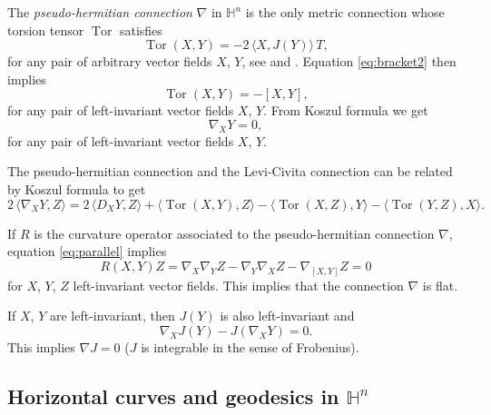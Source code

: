 \documentclass[10pt]{amsart}
\theoremstyle{definition}
\theoremstyle{remark}
\numberwithin{equation}{section}
\begin{document}
The \emph{pseudo-hermitian connection} $\nabla$ in ${{\mathbb{H}}}^n$ is the only metric connection whose torsion tensor $\operatorname{Tor}$ satisfies 
\begin{equation}
\label{eq:torsion}
\operatorname{Tor}(X,Y)=-2\,{\langle{X,J(Y)}\rangle}\,T,
\end{equation}
for any pair of arbitrary vector fields $X$, $Y$, see \cite{MR1000553} and \cite{MR1267892}. Equation \eqref{eq:bracket2} then implies
\[
\operatorname{Tor}(X,Y)=-[X,Y],
\]
for any pair of left-invariant vector fields $X$, $Y$. From Koszul formula we get
\begin{equation}
\label{eq:parallel}
\nabla_X Y=0,
\end{equation}
for any pair of left-invariant vector fields $X$, $Y$.

The pseudo-hermitian connection and the Levi-Civita connection can be related by Koszul formula to get
\[
2\,{\langle{\nabla_{X}Y,Z}\rangle}=2\,{\langle{D_{X}Y,Z}\rangle}+{\langle{\operatorname{Tor}(X,Y),Z}\rangle}
-{\langle{\operatorname{Tor}(X,Z),Y}\rangle}-{\langle{\operatorname{Tor}(Y,Z),X}\rangle}.
\]

If $R$ is the curvature operator associated to the pseudo-hermitian connection $\nabla$, equation \eqref{eq:parallel} implies
\begin{equation}
R(X,Y)Z=\nabla_X\nabla_YZ-\nabla_Y\nabla_XZ-\nabla_{[X,Y]}Z=0
\end{equation}
for $X$, $Y$, $Z$ left-invariant vector fields. This implies that the connection $\nabla$ is flat.

If $X$, $Y$ are left-invariant, then $J(Y)$ is also left-invariant and
\[
\nabla_X J(Y)-J(\nabla_XY)=0.
\]
This implies $\nabla J=0$ ($J$ is integrable in the sense of Frobenius).

\subsection{Horizontal curves and geodesics in ${{\mathbb{H}}}^n$}
\label{sub:geodesics}
\end{document}
